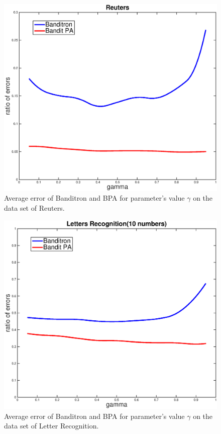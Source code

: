 \begin{figure}[h!]
\centerline{
\includegraphics[scale = 0.4]{fig05/mc/Reuters_gamma.eps}}
\caption{Average error of Banditron and BPA for parameter's value $\gamma$ on the data set of Reuters.}
\label{pic:BPARCVerr}
\end{figure}

\begin{figure}[h!]
\label{pic:BPARCVerr}
\centerline{
\includegraphics[scale = 0.4]{fig05/mc/10LR_gamma.eps}}
\caption{Average error of Banditron and BPA for parameter's value $\gamma$ on the data set of Letter Recognition.}
\end{figure}

